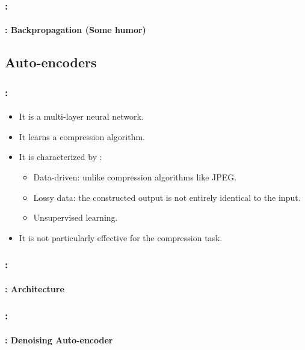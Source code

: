 \documentclass[xcolor=table]{beamer}
\begin{document}
\begin{frame}
	\frametitle{\insertshortsubtitle: \insertsection}
	\framesubtitle{\insertsubsection: Backpropagation (Some humor)}
	

\end{frame}

\subsection{Auto-encoders}

\begin{frame}
	\frametitle{\insertshortsubtitle: \insertsection}
	\framesubtitle{\insertsubsection}
	
	\begin{itemize}
		\item It is a multi-layer neural network.
		\item It learns a compression algorithm.
		\item It is characterized by \cite{2016-keras}:
		\begin{itemize}
			\item Data-driven: unlike compression algorithms like JPEG.
			\item Lossy data: the constructed output is not entirely identical to the input.
			\item Unsupervised learning.
		\end{itemize}
		\item It is not particularly effective for the compression task.
	\end{itemize}

\end{frame}

\begin{frame}
	\frametitle{\insertshortsubtitle: \insertsection}
	\framesubtitle{\insertsubsection: Architecture}


\end{frame}

\begin{frame}
	\frametitle{\insertshortsubtitle: \insertsection}
	\framesubtitle{\insertsubsection: Denoising Auto-encoder}


\end{frame}
\end{document}
